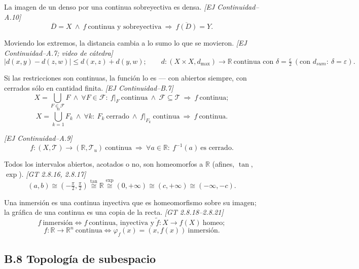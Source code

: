\documentclass[11pt,a4paper]{article}
\theoremstyle{definition}
\theoremstyle{plain}
\newcommand{\fnt}[1]{{\normalfont\small\itshape\color{gray!150!black}[#1]}}
\newcommand{\R}{\mathbb{R}}
\newcommand{\cl}[1]{\overline{#1}}
\newcommand{\tp}{\mathcal{T}}
\begin{document}
\begin{itemize}[leftmargin=1.3em,itemsep=3pt]
 La imagen de un denso por una continua sobreyectiva es densa. \fnt{EJ Continuidad--A.10}
\[ \cl D=X\ \wedge\ f\ \text{continua y sobreyectiva}\ \Rightarrow\ \cl{f(D)}=Y. \]

 Moviendo los extremos, la distancia cambia a lo sumo lo que se movieron. \fnt{EJ Continuidad--A.7; video de cátedra}
\[ |d(x,y)-d(z,w)|\le d(x,z)+d(y,w);\qquad d:(X\times X,d_{\max})\to\R\ \text{continua con } \delta=\tfrac\varepsilon2\ (\text{con } d_{sum}:\ \delta=\varepsilon). \]

 Si las restricciones son continuas, la función lo es --- con abiertos siempre, con cerrados sólo en cantidad finita. \fnt{EJ Continuidad--B.7}
\[ X=\bigcup_{F\in\mathcal F}F\ \wedge\ \forall F\in\mathcal F:\ f|_F\ \text{continua}\ \wedge\ \mathcal F\subseteq\tp\ \Rightarrow\ f\ \text{continua}; \]
\[ X=\bigcup_{k=1}^{n}F_k\ \wedge\ \forall k:\ F_k\ \text{cerrado}\ \wedge\ f|_{F_k}\ \text{continua}\ \Rightarrow\ f\ \text{continua}. \]

 \fnt{EJ Continuidad--A.9}
\[ f:(X,\tp)\to(\R,\tp_u)\ \text{continua}\ \Rightarrow\ \forall a\in\R:\ f^{-1}(a)\ \text{es cerrado}. \]

 Todos los intervalos abiertos, acotados o no, son homeomorfos a $\R$ (afines, $\tan$, $\exp$). \fnt{GT 2.8.16, 2.8.17}
\[ (a,b)\cong(-\tfrac\pi2,\tfrac\pi2)\overset{\tan}{\cong}\R\overset{\exp}{\cong}(0,+\infty)\cong(c,+\infty)\cong(-\infty,-c). \]

 Una inmersión es una continua inyectiva que es homeomorfismo sobre su imagen; la gráfica de una continua es una copia de la recta. \fnt{GT 2.8.18--2.8.21}
\[ f\ \text{inmersión}\iff f\ \text{continua, inyectiva y}\ \widetilde f:X\to f(X)\ \text{homeo}; \]
\[ f:\R\to\R^n\ \text{continua}\iff \varphi_f(x)=(x,f(x))\ \text{inmersión}. \]

\end{itemize}

\subsection*{B.8 Topología de subespacio}
\end{document}
